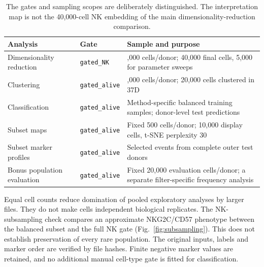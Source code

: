 \documentclass[11pt,a4paper]{article}
\begin{document}
\begin{table}[htb]\centering\small
\begin{tabular}{@{}>{\raggedright\arraybackslash}p{.25\linewidth}>{\raggedright\arraybackslash}p{.18\linewidth}>{\raggedright\arraybackslash}p{.49\linewidth}@{}}\toprule
Analysis & Gate & Sample and purpose\\\midrule
Dimensionality reduction & \texttt{gated\_NK} & 2,000 cells/donor; 40,000 final cells, 5,000 for parameter sweeps\\
Clustering & \texttt{gated\_alive} & 1,000 cells/donor; 20,000 cells clustered in 37D\\
Classification & \texttt{gated\_alive} & Method-specific balanced training samples; donor-level test predictions\\
Subset maps & \texttt{gated\_alive} & Fixed 500 cells/donor; 10,000 display cells, t-SNE perplexity 30\\
Subset marker profiles & \texttt{gated\_alive} & Selected events from complete outer test donors\\
Bonus population evaluation & \texttt{gated\_alive} & Fixed 20,000 evaluation cells/donor; a separate filter-specific frequency analysis\\\bottomrule
\end{tabular}
\caption{The gates and sampling scopes are deliberately distinguished. The interpretation map is not the 40,000-cell NK embedding of the main dimensionality-reduction comparison.}
\end{table}

Equal cell counts reduce domination of pooled exploratory analyses by larger files. They do not make cells independent biological replicates. The NK-subsampling check compares an approximate NKG2C/CD57 phenotype between the balanced subset and the full NK gate (Fig.~\ref{fig:subsampling}). This does not establish preservation of every rare population. The original inputs, labels and marker order are verified by file hashes. Finite negative marker values are retained, and no additional manual cell-type gate is fitted for classification.

\clearpage
\begin{table}[htb]\centering\small

\caption{Donor inventory from the current raw-data summaries. Test visits are the appearances in the 30 common outer splits. The same counts apply to every method. NK/alive is a percentage, not an additional classifier feature.}
\label{tab:donors}
\end{table}
\end{document}
